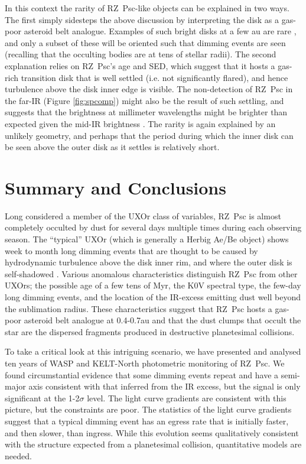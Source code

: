 \documentclass[useAMS,usenatbib,usegraphicx]{mn2e}
\begin{document}
In this context the rarity of RZ~Psc-like objects can be explained in two ways. The first
simply sidesteps the above discussion by interpreting the disk as a gas-poor asteroid
belt analogue. Examples of such bright disks at a few au are rare
\citep{2013MNRAS.433.2334K}, and only a subset of these will be oriented such that
dimming events are seen (recalling that the occulting bodies are at tens of stellar
radii). The second explanation relies on RZ~Psc's age and SED, which suggest that it
hosts a gas-rich transition disk that is well settled (i.e. not significantly flared),
and hence turbulence above the disk inner edge is visible. The non-detection of RZ~Psc in
the far-IR (Figure \ref{fig:spcomp}) might also be the result of such settling, and
suggests that the brightness at millimeter wavelengths might be brighter than expected
given the mid-IR brightness \citep[e.g.][]{2007prpl.conf..555D}. The rarity is again
explained by an unlikely geometry, and perhaps that the period during which the inner
disk can be seen above the outer disk as it settles is relatively short.

\section{Summary and Conclusions}\label{s:conc}

Long considered a member of the UXOr class of variables, RZ~Psc is almost completely
occulted by dust for several days multiple times during each observing season. The
``typical'' UXOr (which is generally a Herbig Ae/Be object) shows week to month long
dimming events that are thought to be caused by hydrodynamic turbulence above the disk
inner rim, and where the outer disk is self-shadowed \citep{2003ApJ...594L..47D}. Various
anomalous characteristics distinguish RZ~Psc from other UXOrs; the possible age of a few
tens of Myr, the K0V spectral type, the few-day long dimming events, and the location of
the IR-excess emitting dust well beyond the sublimation radius. These characteristics
suggest that RZ~Psc hosts a gas-poor asteroid belt analogue at 0.4-0.7au and that the
dust clumps that occult the star are the dispersed fragments produced in destructive
planetesimal collisions.

To take a critical look at this intriguing scenario, we have presented and analysed ten
years of WASP and KELT-North photometric monitoring of RZ~Psc. We found circumstantial
evidence that some dimming events repeat and have a semi-major axis consistent with that
inferred from the IR excess, but the signal is only significant at the 1-2$\sigma$
level. The light curve gradients are consistent with this picture, but the constraints
are poor. The statistics of the light curve gradients suggest that a typical dimming
event has an egress rate that is initially faster, and then slower, than ingress. While
this evolution seems qualitatively consistent with the structure expected from a
planetesimal collision, quantitative models are needed.
\end{document}
